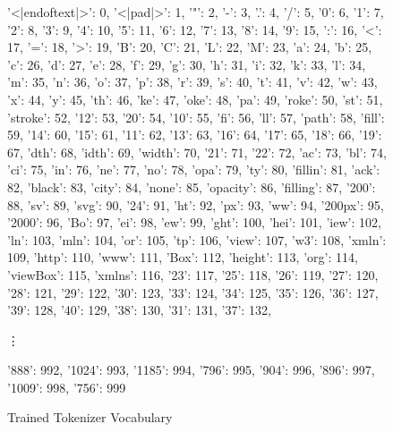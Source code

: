 \documentclass[11pt]{article}
\begin{document}
\begin{figure}[htbp]
	{'<|endoftext|>': 0,
		'<|pad|>': 1, '"': 2, '-': 3, '.': 4, '/': 5, '0': 6, '1': 7, '2': 8, '3': 9, '4': 10, '5': 11, '6': 12, '7': 13, '8': 14,
		'9': 15, ':': 16, '<': 17, '=': 18, '>': 19, 'B': 20, 'C': 21, 'L': 22, 'M': 23, 'a': 24, 'b': 25, 'c': 26, 'd': 27, 'e': 28, 'f': 29,
		'g': 30, 'h': 31, 'i': 32, 'k': 33, 'l': 34, 'm': 35, 'n': 36, 'o': 37, 'p': 38, 'r': 39, 's': 40, 't': 41, 'v': 42, 'w': 43, 'x': 44, 'y': 45, 'th': 46, 'ke': 47,
		'oke': 48,
		'pa': 49,
		'roke': 50,
		'st': 51,
		'stroke': 52,
		'12': 53,
		'20': 54,
		'10': 55,
		'fi': 56,
		'll': 57,
		'path': 58,
		'fill': 59,
		'14': 60,
		'15': 61,
		'11': 62,
		'13': 63,
		'16': 64,
		'17': 65,
		'18': 66,
		'19': 67,
		'dth': 68,
		'idth': 69,
		'width': 70,
		'21': 71,
		'22': 72,
		'ac': 73,
		'bl': 74,
		'ci': 75,
		'in': 76,
		'ne': 77,
		'no': 78,
		'opa': 79,
		'ty': 80,
		'fillin': 81,
		'ack': 82,
		'black': 83,
		'city': 84,
		'none': 85,
		'opacity': 86,
		'filling': 87,
		'200': 88,
		'sv': 89,
		'svg': 90,
		'24': 91,
		'ht': 92,
		'px': 93,
		'ww': 94,
		'200px': 95,
		'2000': 96,
		'Bo': 97,
		'ei': 98,
		'ew': 99,
		'ght': 100,
		'hei': 101,
		'iew': 102,
		'ln': 103,
		'mln': 104,
		'or': 105,
		'tp': 106,
		'view': 107,
		'w3': 108,
		'xmln': 109,
		'http': 110,
		'www': 111,
		'Box': 112,
		'height': 113,
		'org': 114,
		'viewBox': 115,
		'xmlns': 116,
		'23': 117,
		'25': 118,
		'26': 119,
		'27': 120,
		'28': 121,
		'29': 122,
		'30': 123,
		'33': 124,
		'34': 125,
		'35': 126,
		'36': 127,
		'39': 128,
		'40': 129,
		'38': 130,
		'31': 131,
		'37': 132,

		\vdots

		'888': 992,
		'1024': 993,
		'1185': 994,
		'796': 995,
		'904': 996,
		'896': 997,
		'1009': 998,
		'756': 999
	}
	\caption{Trained Tokenizer Vocabulary}
	\label{vocab}
\end{figure}
\end{document}
